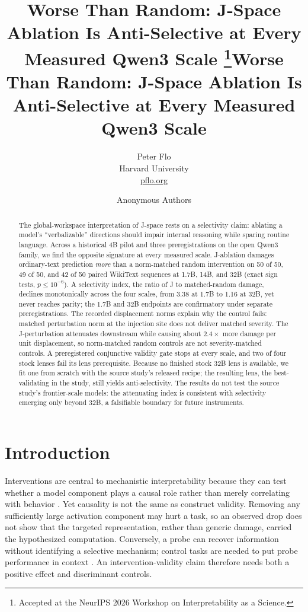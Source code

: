 \documentclass{article}
\title{Worse Than Random: J-Space Ablation Is Anti-Selective at Every Measured Qwen3 Scale%
    \thanks{Accepted at the NeurIPS 2026 Workshop on Interpretability as a Science.}}
\author{Peter Flo\\Harvard University\\\href{https://pflo.org}{pflo.org}}
\title{Worse Than Random: J-Space Ablation Is Anti-Selective at Every Measured Qwen3 Scale}
\author{Anonymous Authors}
\newcommand{\jspace}{J-space}
\begin{document}
\maketitle

\begin{abstract}
The global-workspace interpretation of \jspace{} rests on a selectivity claim: ablating a
model's ``verbalizable'' directions should impair internal reasoning while sparing routine
language. Across a historical 4B pilot and three preregistrations on the open Qwen3 family, we find the opposite
signature at every measured scale. J-ablation damages ordinary-text prediction
\emph{more} than a norm-matched random intervention on 50 of 50, 49 of 50, and 42
of 50 paired WikiText sequences at 1.7B, 14B, and 32B (exact sign tests, $p\le10^{-6}$).
A selectivity index, the ratio of J to matched-random damage, declines
monotonically across the four scales, from 3.38 at 1.7B to 1.16 at 32B, yet never reaches
parity; the 1.7B and 32B endpoints are confirmatory under separate preregistrations. The recorded displacement
norms explain why the control fails: matched perturbation norm at the
injection site does not deliver matched severity. The J-perturbation attenuates
downstream while causing about $2.4\times$ more damage per unit displacement, so
norm-matched random controls are not severity-matched controls. A preregistered
conjunctive validity gate stops at every scale, and two of four stock lenses fail its
lens prerequisite. Because no finished stock 32B lens is available, we fit one from
scratch with the source study's released recipe; the resulting lens, the best-validating in the study,
still yields anti-selectivity. The results do not test
the source study's frontier-scale models: the attenuating index is consistent with
selectivity emerging only beyond 32B, a falsifiable boundary for future instruments.
\end{abstract}

\section{Introduction}

Interventions are central to mechanistic interpretability because they can test whether a
model component plays a causal role rather than merely correlating with behavior
\citep{geiger2021causal}. Yet causality is not the same as construct validity. Removing
any sufficiently large activation component may hurt a task, so an observed drop does not
show that the targeted representation, rather than generic damage, carried the
hypothesized computation. Conversely, a probe can recover information without identifying
a selective mechanism; control tasks are needed to put probe performance in context
\citep{hewitt2019controls}. An intervention-validity claim therefore needs both a positive
effect and discriminant controls.
\end{document}
